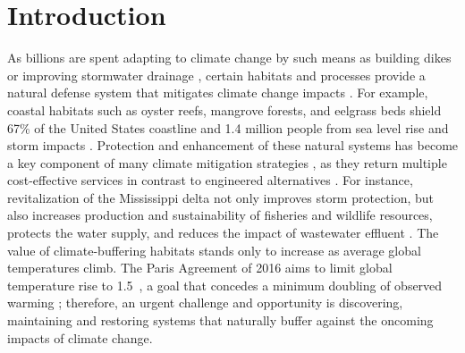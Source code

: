 \documentclass[draft,linenumbers]{AGUJournal}
\begin{document}
\section{Introduction}

As billions are spent adapting to climate change by such means as building dikes or improving stormwater drainage \citep{Narain:2011}, certain habitats and processes provide a natural defense system that mitigates climate change impacts \citep{Jones:2012}. For example, coastal habitats such as oyster reefs, mangrove forests, and eelgrass beds shield 67\% of the United States coastline and 1.4 million people from sea level rise and storm impacts \citep{Arkema:2013}. Protection and enhancement of these natural systems has become a key component of many climate mitigation strategies \citep{Guerry:2015}, as they return multiple cost-effective services in contrast to engineered alternatives \citep{Jones:2012}. For instance, revitalization of the Mississippi delta not only improves storm protection, but also increases production and sustainability of fisheries and wildlife resources, protects the water supply, and reduces the impact of wastewater effluent \citep{LDNR:1998}. The value of climate-buffering habitats stands only to increase as average global temperatures climb. The Paris Agreement of 2016 aims to limit global temperature rise to 1.5\celsius~\citep{Hulme:2016}, a goal that concedes a minimum doubling of observed warming \citep{Hartmann:2013}; therefore, an urgent challenge and opportunity is discovering, maintaining and restoring systems that naturally buffer against the oncoming impacts of climate change.
\end{document}
